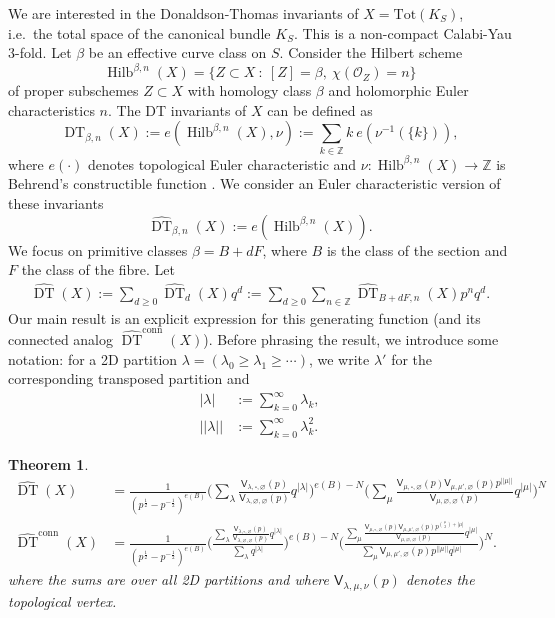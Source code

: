 \documentclass{amsart}
\newtheorem{theorem}{Theorem}%
\theoremstyle{definition}
\newcommand{\ZZ} {\mathbb{Z}}		%
\renewcommand{\O}{\mathcal{O}}
\newcommand{\sfV}{\mathsf{V}}
\newcommand{\Hilb}{\operatorname{Hilb}}
\newcommand{\DT}{\operatorname{DT}}
\newcommand{\conn}{\operatorname{conn}}
\begin{document}
We are interested in the Donaldson-Thomas invariants of $X = \mathrm{Tot}(K_S)$, i.e.~the total space of the canonical bundle $K_S$. This is a non-compact Calabi-Yau 3-fold. Let $\beta$ be an effective curve class on $S$. Consider the Hilbert scheme 
$$
\Hilb^{\beta,n}(X) = \{ Z \subset X \ : \ [Z] = \beta, \ \chi(\O_Z) = n\}
$$
of proper subschemes $Z \subset X$ with homology class $\beta$ and holomorphic Euler characteristics $n$. The DT invariants of $X$ can be defined as
$$
\DT_{\beta,n}(X) := e(\Hilb^{\beta,n}(X), \nu) := \sum_{k \in \ZZ} k \ e(\nu^{-1}(\{k\})),
$$
where $e(\cdot)$ denotes topological Euler characteristic and $\nu : \Hilb^{\beta,n}(X) \rightarrow \ZZ$ is Behrend's constructible function \cite{Beh}. We consider an Euler characteristic version of these invariants
$$
\widehat{\DT}_{\beta,n}(X) := e(\Hilb^{\beta,n}(X)).
$$
We focus on primitive classes $\beta = B + dF$, where $B$ is the class of the section and $F$ the class of the fibre. Let 
\begin{align*}
\widehat{\DT}(X) := \sum_{d \geq 0} \widehat{\DT}_d(X) q^d := \sum_{d \geq 0} \sum_{n \in \ZZ} \widehat{\DT}_{B+dF,n}(X) p^n q^d.
\end{align*}
Our main result is an explicit expression for this generating function (and its connected analog $\widehat{\DT}^{\conn}(X)$). Before phrasing the result, we introduce some notation: for a 2D partition $\lambda = (\lambda_0 \geq \lambda_1 \geq \cdots)$, we write $\lambda'$ for the corresponding transposed partition and 
\begin{align*}
|\lambda| &:= \sum_{k=0}^{\infty} \lambda_k, \\
|\!|\lambda|\!| &:= \sum_{k=0}^{\infty} \lambda_{k}^{2}.
\end{align*}
\begin{theorem} \label{main}
\begin{align*}
\widehat{\DT}(X) &= \frac{1}{(p^{\frac{1}{2}} - p^{-\frac{1}{2}})^{e(B)}} \Bigg( \sum_{\lambda} \frac{\sfV_{\lambda,\square,\varnothing}(p)}{\sfV_{\lambda,\varnothing,\varnothing}(p)} q^{|\lambda|} \Bigg)^{e(B) - N}  \Bigg( \sum_{\mu} \frac{\sfV_{\mu,\square,\varnothing}(p) \sfV_{\mu,\mu',\varnothing}(p) p^{|\!|\mu|\!|}}{\sfV_{\mu,\varnothing,\varnothing}(p)} q^{|\mu|} \Bigg)^{N} \\
\widehat{\DT}^{\conn}(X) &= \frac{1}{(p^{\frac{1}{2}} - p^{-\frac{1}{2}})^{e(B)}} \Bigg( \frac{\sum_{\lambda} \frac{\sfV_{\lambda,\square,\varnothing}(p)}{\sfV_{\lambda,\varnothing,\varnothing}(p)} q^{|\lambda|}}{\sum_{\lambda} q^{|\lambda|}} \Bigg)^{e(B) - N}  \Bigg( \frac{\sum_{\mu} \frac{\sfV_{\mu,\square,\varnothing}(p) \sfV_{\mu,\mu',\varnothing}(p) p^{\binom{\mu}{2} +|\mu|}}{\sfV_{\mu,\varnothing,\varnothing}(p)} q^{|\mu|}}{\sum_{\mu} \sfV_{\mu, \mu', \varnothing}(p) p^{|\!|\mu|\!|} q^{|\mu|}} \Bigg)^{N}.
\end{align*}
where the sums are over all 2D partitions and where $\sfV_{\lambda,\mu,\nu}(p)$ denotes the topological vertex.
\end{theorem}
\end{document}
